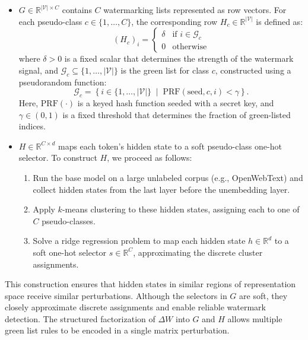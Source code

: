\begin{itemize}
    \item \( G \in \mathbb{R}^{|\mathcal{V}| \times C} \) contains \( C \) watermarking lists represented as row vectors. For each pseudo-class \( c \in \{1, \dots, C\} \), the corresponding row \( H_c \in \mathbb{R}^{|\mathcal{V}|} \) is defined as:
    \[
    (H_c)_i = 
    \begin{cases}
    \delta & \text{if } i \in \mathcal{G}_c \\
    0 & \text{otherwise}
    \end{cases}
    \]
    where \( \delta > 0 \) is a fixed scalar that determines the strength of the watermark signal, and \( \mathcal{G}_c \subseteq \{1, \dots, |\mathcal{V}|\} \) is the green list for class \( c \), constructed using a pseudorandom function:
    \[
    \mathcal{G}_c = \left\{ i \in \{1, \dots, |\mathcal{V}|\} \;\middle|\; \mathrm{PRF}(\text{seed}, c, i) < \gamma \right\}.
    \]
    Here, \(\mathrm{PRF}(\cdot)\) is a keyed hash function seeded with a secret key, and \(\gamma \in (0,1)\) is a fixed threshold that determines the fraction of green-listed indices.

    \item \( H \in \mathbb{R}^{C \times d} \) maps each token's hidden state to a soft pseudo-class one-hot selector. To construct \( H \), we proceed as follows:
    \begin{enumerate}
        \item Run the base model on a large unlabeled corpus (e.g., OpenWebText) and collect hidden states from the last layer before the unembedding layer.
            \item Apply \( k \)-means clustering to these hidden states, assigning each to one of \( C \) pseudo-classes.
            \item Solve a ridge regression problem to map each hidden state \( h \in \mathbb{R}^d \) to a soft one-hot selector \( s \in \mathbb{R}^C \), approximating the discrete cluster assignments.
    \end{enumerate}
\end{itemize}

This construction ensures that hidden states in similar regions of representation space receive similar perturbations. Although the selectors in \( G \) are soft, they closely approximate discrete assignments and enable reliable watermark detection. The structured factorization of \( \Delta W \) into \( G \) and \( H \) allows multiple green list rules to be encoded in a single matrix perturbation.

